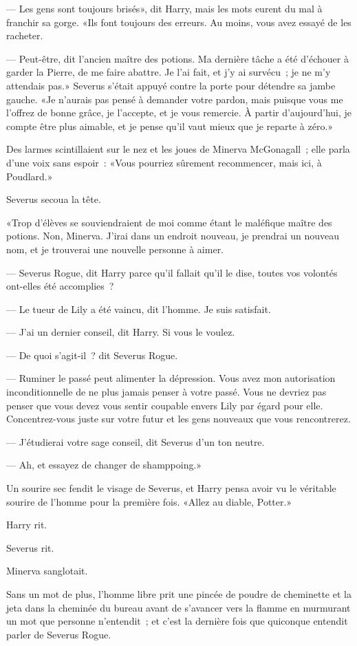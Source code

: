--- Les gens sont toujours brisés», dit Harry, mais les mots eurent du mal à franchir sa gorge. «Ils font toujours des erreurs. Au moins, vous avez essayé de les racheter.

--- Peut-être, dit l'ancien maître des potions. Ma dernière tâche a été d'échouer à garder la Pierre, de me faire abattre. Je l'ai fait, et j'y ai survécu~; je ne m'y attendais pas.» Severus s'était appuyé contre la porte pour détendre sa jambe gauche. «Je n'aurais pas pensé à demander votre pardon, mais puisque vous me l'offrez de bonne grâce, je l'accepte, et je vous remercie. À partir d'aujourd'hui, je compte être plus aimable, et je pense qu'il vaut mieux que je reparte à zéro.»

Des larmes scintillaient sur le nez et les joues de Minerva McGonagall~; elle parla d'une voix sans espoir~: «Vous pourriez sûrement recommencer, mais ici, à Poudlard.»

Severus secoua la tête.

«Trop d'élèves se souviendraient de moi comme étant le maléfique maître des potions. Non, Minerva. J'irai dans un endroit nouveau, je prendrai un nouveau nom, et je trouverai une nouvelle personne à aimer.

--- Severus Rogue, dit Harry parce qu'il fallait qu'il le dise, toutes vos volontés ont-elles été accomplies~?

--- Le tueur de Lily a été vaincu, dit l'homme. Je suis satisfait.

--- J'ai un dernier conseil, dit Harry. Si vous le voulez.

--- De quoi s'agit-il~? dit Severus Rogue.

--- Ruminer le passé peut alimenter la dépression. Vous avez mon autorisation inconditionnelle de ne plus jamais penser à votre passé. Vous ne devriez pas penser que vous devez vous sentir coupable envers Lily par égard pour elle. Concentrez-vous juste sur votre futur et les gens nouveaux que vous rencontrerez.

--- J'étudierai votre sage conseil, dit Severus d'un ton neutre.

--- Ah, et essayez de changer de shamppoing.»

Un sourire sec fendit le visage de Severus, et Harry pensa avoir vu le véritable sourire de l'homme pour la première fois. «Allez au diable, Potter.»

Harry rit.

Severus rit.

Minerva sanglotait.

Sans un mot de plus, l'homme libre prit une pincée de poudre de cheminette et la jeta dans la cheminée du bureau avant de s'avancer vers la flamme en murmurant un mot que personne n'entendit~; et c'est la dernière fois que quiconque entendit parler de Severus Rogue. 
